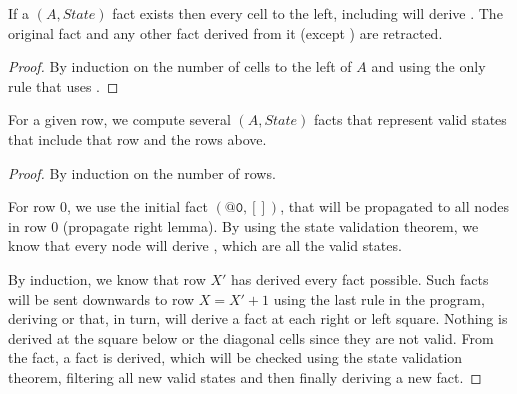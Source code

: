 \begin{lemma}
If a $(A, State)$ fact exists then every cell to the left,
including  will derive . The original
 fact and any other fact derived from it (except
) are retracted.
\end{lemma}
\begin{proof}
By induction on the number of cells to the left of $A$ and using the only rule
that uses .
\end{proof}

\begin{theorem}
For a given row, we compute several $(A, State)$ facts that
represent valid states that include that row and the rows above.
\end{theorem}
\begin{proof}
By induction on the number of rows.

For row 0, we use the initial fact $(\mathtt{@0}, [])$,
that will be propagated to all nodes in row 0 (propagate right lemma). By using
the state validation theorem, we know that every node will derive
, which are all the valid states.

By induction, we know that row $X'$ has derived every  fact
possible. Such facts will be sent downwards to row $X = X' + 1$ using the last
rule in the program, deriving  or 
that, in turn, will derive a  fact at each right or left square.
Nothing is derived at the square below or the diagonal cells since they are not
valid.  From the  fact, a  fact is derived, which will be
checked using the state validation theorem, filtering all new valid
states and then finally deriving a new  fact.

\end{proof}

